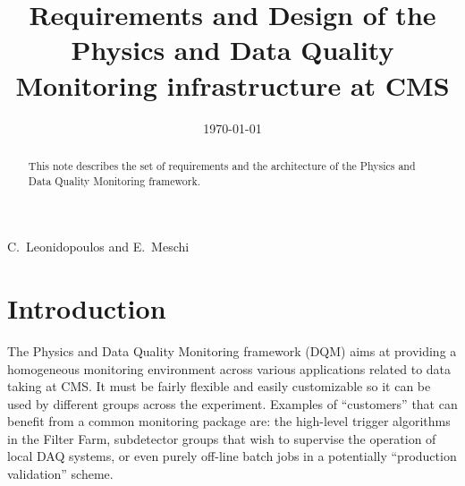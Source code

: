 \documentclass{cmspaper}
\begin{document}

\begin{titlepage}

   \date{\today}
\smallskip
\smallskip


  \title{Requirements and Design of the Physics and Data Quality
Monitoring infrastructure at CMS}

  \begin{Authlist}
    C.~Leonidopoulos and E.~Meschi
  \end{Authlist}


  \begin{abstract}
  This note describes the set of requirements and the architecture of
the Physics and Data Quality Monitoring framework. 
  \end{abstract} 

  
\end{titlepage}

\setcounter{page}{2}%

\section{Introduction} \label{sec:introduction}
%
The Physics and Data Quality Monitoring framework (DQM) aims at
providing a homogeneous monitoring environment across various
applications related to data taking at CMS. It must be fairly flexible
and easily customizable so it can be used by different groups across the
experiment. Examples of ``customers'' that can benefit from a common monitoring
package are: the high-level trigger algorithms in the Filter Farm,
subdetector groups that wish to supervise the operation of local DAQ
systems, or even purely off-line batch jobs in a potentially
``production validation'' scheme. 
\end{document}
